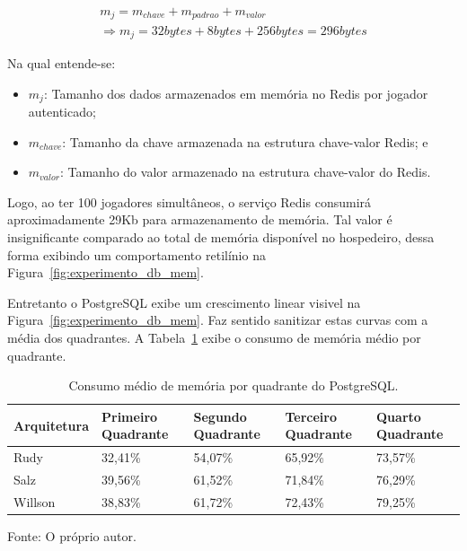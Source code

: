 \begin{multline}
m_j = m_{chave} + m_{padrao} + m_{valor} \\
\Rightarrow m_j = 32bytes + 8bytes + 256bytes = 296bytes
\end{multline}

Na qual entende-se:

\begin{itemize}
\item $m_j$: Tamanho dos dados armazenados em memória no Redis por jogador autenticado;
\item $m_{chave}$: Tamanho da chave armazenada na estrutura chave-valor Redis; e
\item $m_{valor}$: Tamanho do valor armazenado na estrutura chave-valor do Redis.
\end{itemize}


Logo, ao ter 100 jogadores simultâneos, o serviço Redis consumirá aproximadamente 29Kb para armazenamento de memória.
%
Tal valor é insignificante comparado ao total de memória disponível no hospedeiro, dessa forma exibindo um comportamento retilínio na Figura~\ref{fig:experimento_db_mem}.

Entretanto o PostgreSQL exibe um crescimento linear visivel na Figura~\ref{fig:experimento_db_mem}.
%
Faz sentido sanitizar estas curvas com a média dos quadrantes.
%
A Tabela~\ref{tab:mem_db_media_quadrantes} exibe o consumo de memória médio por quadrante.

\begin{table}[htb!]
\centering
\begin{adjustbox}{max width=\textwidth}
\caption{Consumo médio de memória por quadrante do PostgreSQL.}
\label{tab:mem_db_media_quadrantes}

\begin{tabular}{|l|l|l|l|l|}
\hline
Arquitetura & Primeiro Quadrante & Segundo Quadrante & Terceiro Quadrante & Quarto Quadrante \\ \hline
Rudy        & 32,41\%            & 54,07\%           & 65,92\%            & 73,57\%          \\ \hline
Salz        & 39,56\%            & 61,52\%           & 71,84\%            & 76,29\%          \\ \hline
Willson     & 38,83\%            & 61,72\%           & 72,43\%            & 79,25\%          \\ \hline
\end{tabular}
\end{adjustbox}

Fonte: O próprio autor.
\end{table}

